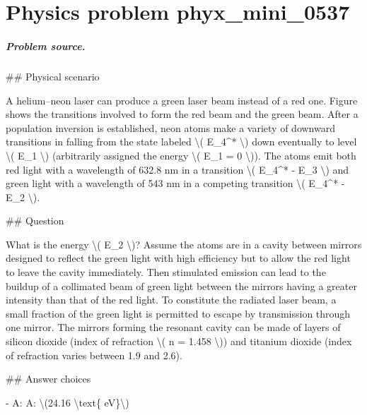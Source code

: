 
\chapter{Physics problem phyx\_mini\_0537}
\label{ch:PhyXMiniProblems_problem_phyx_mini_0537}

\paragraph{Problem source.}
\#\# Physical scenario

A helium--neon laser can produce a green laser beam instead of a red one. Figure shows the transitions involved to form the red beam and the green beam. After a population inversion is established, neon atoms make a variety of downward transitions in falling from the state labeled \textbackslash{}( E\_4\textasciicircum{}* \textbackslash{}) down eventually to level \textbackslash{}( E\_1 \textbackslash{}) (arbitrarily assigned the energy \textbackslash{}( E\_1 = 0 \textbackslash{})). The atoms emit both red light with a wavelength of 632.8 nm in a transition \textbackslash{}( E\_4\textasciicircum{}* - E\_3 \textbackslash{}) and green light with a wavelength of 543 nm in a competing transition \textbackslash{}( E\_4\textasciicircum{}* - E\_2 \textbackslash{}).

\#\# Question

What is the energy \textbackslash{}( E\_2 \textbackslash{})? Assume the atoms are in a cavity between mirrors designed to reflect the green light with high efficiency but to allow the red light to leave the cavity immediately. Then stimulated emission can lead to the buildup of a collimated beam of green light between the mirrors having a greater intensity than that of the red light. To constitute the radiated laser beam, a small fraction of the green light is permitted to escape by transmission through one mirror. The mirrors forming the resonant cavity can be made of layers of silicon dioxide (index of refraction \textbackslash{}( n = 1.458 \textbackslash{})) and titanium dioxide (index of refraction varies between 1.9 and 2.6).

\#\# Answer choices

- A: A: \textbackslash{}(24.16 \textbackslash{}text\{ eV\}\textbackslash{})

